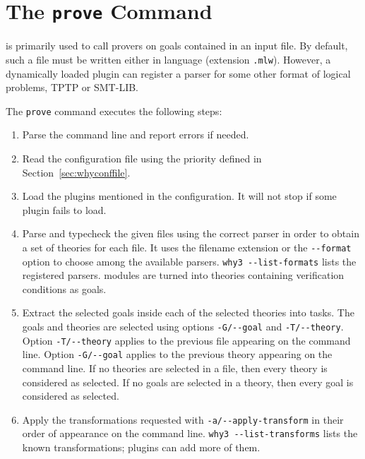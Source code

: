 \section{The \texttt{prove} Command}
\label{sec:why3ref}

\why is primarily used to call provers on goals contained in an
input file. By default, such a file must be written either in \why language
(extension \texttt{.mlw}).
However, a dynamically loaded
plugin can register a parser for some other format of logical problems,
\eg TPTP or SMT-LIB.

The \texttt{prove} command executes the following steps:
\begin{enumerate}
\item Parse the command line and report errors if needed.
\item Read the configuration file using the priority defined in
  Section~\ref{sec:whyconffile}.
\item Load the plugins mentioned in the configuration. It will not
  stop if some plugin fails to load.
\item Parse and typecheck the given files using the correct parser in order
  to obtain a set of \why theories for each file. It uses
  the filename extension or the \verb|--format| option to choose
  among the available parsers. \verb|why3 --list-formats| lists
  the registered parsers.
  \whyml modules are turned into
  theories containing verification conditions as goals.
\item Extract the selected goals inside each of the selected theories
  into tasks. The goals and theories are selected using options
  \verb|-G/--goal| and \verb|-T/--theory|. Option
  \verb|-T/--theory| applies to the previous file appearing on the
  command line. Option \verb|-G/--goal| applies to the previous theory
  appearing on the command line. If no theories are selected in a file,
  then every theory is considered as selected. If no goals are selected
  in a theory, then every goal is considered as selected.
\item Apply the transformations requested
  with \verb|-a/--apply-transform| in their order of appearance on the
  command line. \verb|why3 --list-transforms| lists the known
  transformations; plugins can add more of them.

\end{enumerate}
